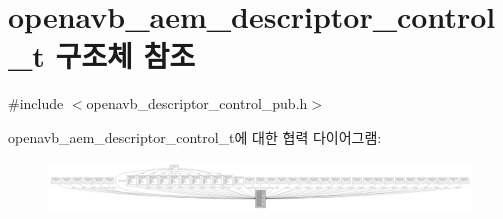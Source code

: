 \hypertarget{structopenavb__aem__descriptor__control__t}{}\section{openavb\+\_\+aem\+\_\+descriptor\+\_\+control\+\_\+t 구조체 참조}
\label{structopenavb__aem__descriptor__control__t}


{\ttfamily \#include $<$openavb\+\_\+descriptor\+\_\+control\+\_\+pub.\+h$>$}



openavb\+\_\+aem\+\_\+descriptor\+\_\+control\+\_\+t에 대한 협력 다이어그램\+:
\nopagebreak
\begin{figure}[H]
\begin{center}
\leavevmode
\includegraphics[width=350pt]{structopenavb__aem__descriptor__control__t__coll__graph}
\end{center}
\end{figure}

